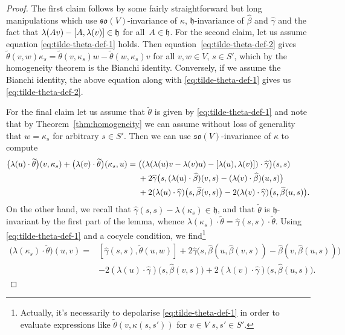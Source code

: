 \documentclass[11pt]{article}
\numberwithin{equation}{section}
\numberwithin{equation}{section}
\newcommand{\fh}{\mathfrak{h}}
\newcommand{\fso}{\mathfrak{so}}
\newcommand{\betahat}{\widehat{\beta}}
\newcommand{\gammahat}{\widehat{\gamma}}
\newcommand{\thetatilde}{\widetilde{\theta}}
\newcommand{\1}{\mathbbm{1}}
\begin{document}
\begin{proof}
	The first claim follows by some fairly straightforward but long manipulations which use $\fso(V)$-invariance of $\kappa$, $\fh$-invariance of $\betahat$ and $\gammahat$ and the fact that $\lambda(Av)-\comm{A}{\lambda(v)}\in\fh$ for all~${A\in\fh}$. For the second claim, let us assume equation \eqref{eq:tilde-theta-def-1} holds. Then equation~\eqref{eq:tilde-theta-def-2} gives~${\thetatilde(v,w)\kappa_s = \thetatilde(v,\kappa_s)w - \thetatilde(w,\kappa_s)v}
$
	for all $v,w\in V$, $s\in S'$, which by the homogeneity theorem is the Bianchi identity. Conversely, if we assume the Bianchi identity, the above equation along with \eqref{eq:tilde-theta-def-1} gives us \eqref{eq:tilde-theta-def-2}.
	
	For the final claim let us assume that $\thetatilde$ is given by \eqref{eq:tilde-theta-def-1} and note that by Theorem~\ref{thm:homogeneity} we can assume without loss of generality that $w=\kappa_s$ for arbitrary $s\in S'$. Then we can use $\fso(V)$-invariance of $\kappa$ to compute
	\begin{align*}
		\bigl(\lambda(u)\cdot\thetatilde\bigr)(v,\kappa_s) + \bigl(\lambda(v)\cdot\thetatilde\bigr)(\kappa_s,u)
			={}& \bigl((\lambda(\lambda(u)v-\lambda(v)u)
				- \comm{\lambda(u)}{\lambda(v)})\cdot\gammahat\bigr)(s,s) \\
				& + 2\gammahat\bigl(s,(\lambda(u)\cdot\betahat)(v,s)
				- (\lambda(v)\cdot\betahat)(u,s)\bigr)\\
				& + 2(\lambda(u)\cdot\gammahat)\bigl(s,\betahat(v,s)\bigr)
				- 2(\lambda(v)\cdot\gammahat)\bigl(s,\betahat(u,s)\bigr).
	\end{align*}
	On the other hand, we recall that $\gammahat(s,s)-\lambda(\kappa_s)\in\fh$, and that $\thetatilde$ is $\fh$-invariant by the first part of the lemma, whence $\lambda(\kappa_s)\cdot\thetatilde=\gammahat(s,s)\cdot\thetatilde$. Using \eqref{eq:tilde-theta-def-1} and a cocycle condition, we find\footnote{Actually, it's necessarily to depolarise \eqref{eq:tilde-theta-def-1} in order to evaluate expressions like $\thetatilde(v,\kappa(s,s'))$ for $v\in V$ $s,s'\in S'$.}
	\begin{align*}
		\bigl(\lambda(\kappa_s)\cdot\thetatilde\bigr)(u,v) ={}& [\gammahat(s,s),\thetatilde(u,w)]
			+ 2\gammahat\bigl(s,\betahat(u,\betahat(v,s))-\betahat(v,\betahat(u,s))\bigr)\\
			& - 2(\lambda(u)\cdot\gammahat)\bigl(s,\betahat(v,s)\bigr)
			+ 2(\lambda(v)\cdot\gammahat)\bigl(s,\betahat(u,s)\bigr).
	\end{align*}

\end{proof}
\end{document}

